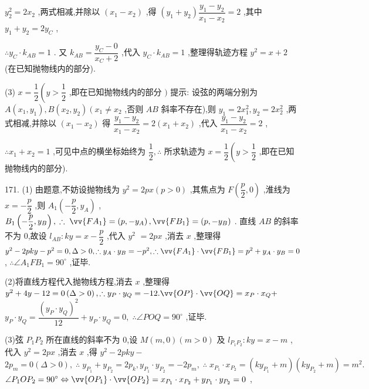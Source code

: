 ${y}_{2}^{2} = 2{x}_{2}$ ,两式相减,并除以 $\left( {{x}_{1} - {x}_{2}}\right)$ ,得 $\left( {{y}_{1} + {y}_{2}}\right) \dfrac{{y}_{1} - {y}_{2}}{{x}_{1} - {x}_{2}} = 2$ ,其中 ${y}_{1} + {y}_{2} = 2{y}_{C}$ ,

$\therefore {y}_{C} \cdot  {k}_{AB} = 1$ . 又 ${k}_{AB} = \dfrac{{y}_{C} - 0}{{x}_{C} + 2}$ ,代入 ${y}_{C} \cdot  {k}_{AB} = 1$ ,整理得轨迹方程 ${y}^{2} = x + 2$ (在已知抛物线内的部分).

(3) $x = \dfrac{1}{2}\left( {y > \dfrac{1}{2}}\right.$ ,即在已知抛物线内的部分 $)$ 提示: 设弦的两端分别为 $A\left( {{x}_{1},{y}_{1}}\right) ,B\left( {{x}_{2},{y}_{2}}\right) \left( {{x}_{1} \neq  {x}_{2}}\right.$ ,否则 ${AB}$ 斜率不存在),则 ${y}_{1} = 2{x}_{1}^{2},{y}_{2} = 2{x}_{2}^{2}$ ,两式相减,并除以 $\left( {{x}_{1} - {x}_{2}}\right)$ 得 $\dfrac{{y}_{1} - {y}_{2}}{{x}_{1} - {x}_{2}} = 2\left( {{x}_{1} + {x}_{2}}\right)$ ,代入 $\dfrac{{y}_{1} - {y}_{2}}{{x}_{1} - {x}_{2}} = 2$ ,

$\therefore {x}_{1} + {x}_{2} = 1$ ,可见中点的横坐标始终为 $\dfrac{1}{2},\therefore$ 所求轨迹为 $x = \dfrac{1}{2}\left( {y > \dfrac{1}{2}}\right.$ ,即在已知抛物线内的部分).

171. (1) 由题意,不妨设抛物线为 ${y}^{2} = {2px}\left( {p > 0}\right)$ ,其焦点为 $F\left( {\dfrac{p}{2},0}\right)$ ,淮线为 $x =  - \dfrac{p}{2}$ ,则 ${A}_{1}\left( {-\dfrac{p}{2},{y}_{A}}\right)$ , ${B}_{1}\left( {-\dfrac{p}{2},{y}_{B}}\right) ,\;\therefore \;\vv{F{A}_{1}} = \left( {p, - {y}_{A}}\right) ,\vv{F{B}_{1}} = \left( {p, - {y}_{B}}\right)$ . 直线 ${AB}$ 的斜率不为 0,故设 ${l}_{AB} : {ky} = x - \dfrac{p}{2}$ ,代入 ${y}^{2}$  $= {2px}$ ,消去 $x$ ,整理得 ${y}^{2} - {2pky} - {p}^{2} = 0,\Delta  > 0,\therefore {y}_{A} \cdot  {y}_{B} =  - {p}^{2},\therefore \vv{F{A}_{1}} \cdot  \vv{F{B}_{1}} = {p}^{2} + {y}_{A} \cdot  {y}_{B} = 0$ , $\therefore \angle {A}_{1}F{B}_{1} = {90}^{ \circ  }$ ,证毕.

(2)将直线方程代入抛物线方程,消去 $x$ ,整理得 ${y}^{2} + {4y} - {12} = 0\left( {\Delta  > 0}\right) ,\therefore {y}_{P} \cdot  {y}_{Q} =  - {12}.\vv{OP} \cdot  \vv{OQ} = {x}_{P} \cdot  {x}_{Q} +$  ${y}_{P} \cdot  {y}_{Q} = \dfrac{{\left( {y}_{P} \cdot  {y}_{Q}\right) }^{2}}{12} + {y}_{P} \cdot  {y}_{Q} = 0,\;\therefore \angle {POQ} = {90}^{ \circ  }$ ,证毕.

(3)弦 ${P}_{1}{P}_{2}$ 所在直线的斜率不为 0,设 $M\left( {m,0}\right) \left( {m > 0}\right)$ 及 ${l}_{{P}_{1}{P}_{2}} : {ky} = x - m$ ,代入 ${y}^{2} = {2px}$ ,消去 $x$ ,得 ${y}^{2} - {2pky} -$  $2{p}_{m} = 0\left( {\Delta  > 0}\right) ,\;\therefore \;{y}_{{P}_{1}} + {y}_{{P}_{2}} = 2{p}_{k},{y}_{{P}_{1}} \cdot  {y}_{{P}_{2}} =  - 2{p}_{m},\;\therefore \;{x}_{{P}_{1}} \cdot  {x}_{{P}_{2}} = \left( {k{y}_{{P}_{1}} + m}\right) \left( {k{y}_{{P}_{2}} + m}\right)  = {m}^{2}.$  $\angle {P}_{1}O{P}_{2} = {90}^{ \circ  } \Leftrightarrow  \vv{O{P}_{1}} \cdot  \vv{O{P}_{2}} = {x}_{{P}_{1}} \cdot  {x}_{{P}_{2}} + {y}_{{P}_{1}} \cdot  {y}_{{P}_{2}} = 0$ ,

